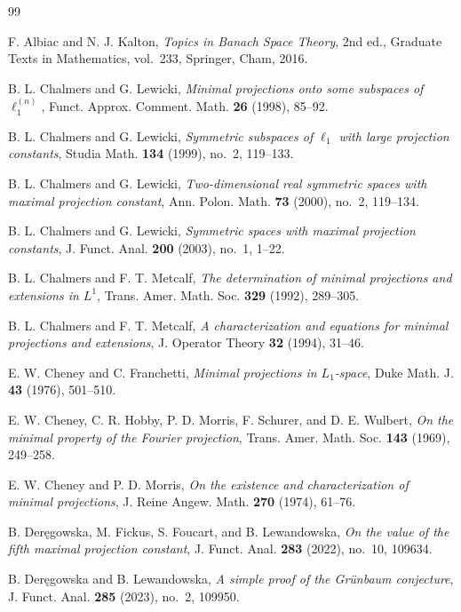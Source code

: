 \documentclass[11pt]{amsart}
\numberwithin{equation}{section}
\theoremstyle{definition}
\theoremstyle{remark}
\begin{document}
\begin{thebibliography}{99}

F. Albiac and N. J. Kalton,
\emph{Topics in Banach Space Theory},
2nd ed., Graduate Texts in Mathematics, vol.~233, Springer, Cham, 2016.

B. L. Chalmers and G. Lewicki,
\emph{Minimal projections onto some subspaces of $\ell_1^{(n)}$},
Funct. Approx. Comment. Math. \textbf{26} (1998), 85--92.

B. L. Chalmers and G. Lewicki,
\emph{Symmetric subspaces of $\ell_1$ with large projection constants},
Studia Math. \textbf{134} (1999), no.~2, 119--133.

B. L. Chalmers and G. Lewicki,
\emph{Two-dimensional real symmetric spaces with maximal projection constant},
Ann. Polon. Math. \textbf{73} (2000), no.~2, 119--134.

B. L. Chalmers and G. Lewicki,
\emph{Symmetric spaces with maximal projection constants},
J. Funct. Anal. \textbf{200} (2003), no.~1, 1--22.

B. L. Chalmers and F. T. Metcalf,
\emph{The determination of minimal projections and extensions in $L^1$},
Trans. Amer. Math. Soc. \textbf{329} (1992), 289--305.

B. L. Chalmers and F. T. Metcalf,
\emph{A characterization and equations for minimal projections and extensions},
J. Operator Theory \textbf{32} (1994), 31--46.

E. W. Cheney and C. Franchetti,
\emph{Minimal projections in $L_1$-space},
Duke Math. J. \textbf{43} (1976), 501--510.

E. W. Cheney, C. R. Hobby, P. D. Morris, F. Schurer, and D. E. Wulbert,
\emph{On the minimal property of the Fourier projection},
Trans. Amer. Math. Soc. \textbf{143} (1969), 249--258.

E. W. Cheney and P. D. Morris,
\emph{On the existence and characterization of minimal projections},
J. Reine Angew. Math. \textbf{270} (1974), 61--76.

B. Deręgowska, M. Fickus, S. Foucart, and B. Lewandowska,
\emph{On the value of the fifth maximal projection constant},
J. Funct. Anal. \textbf{283} (2022), no.~10, 109634.

B. Deręgowska and B. Lewandowska,
\emph{A simple proof of the Grünbaum conjecture},
J. Funct. Anal. \textbf{285} (2023), no.~2, 109950.


\end{thebibliography}
\end{document}
